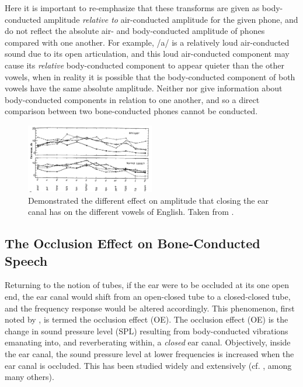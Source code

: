 \documentclass[dissertation,copyright]{uathesis}
\begin{document}
Here it is important to re-emphasize that these transforms are given as body-conducted amplitude \textit{relative to} air-conducted amplitude for the given phone, and do not reflect the absolute air- and body-conducted amplitude of phones compared with one another.  For example, /a/ is a relatively loud air-conducted sound due to its open articulation, and this loud air-conducted component may cause its \textit{relative} body-conducted component to appear quieter than the other vowels, when in reality it is possible that the body-conducted component of both vowels have the same absolute amplitude.  Neither \cite{bekesy:60} nor \cite{reinfeldt:10} give information about body-conducted components in relation to one another, and so a direct comparison between two bone-conducted phones cannot be conducted.


\begin{figure}
\includegraphics[width=0.5\textwidth]{figure/bekesy60-3.png}
\caption{Demonstrated the different effect on amplitude that closing the ear canal has on the different vowels of English.  Taken from \cite{bekesy:60}.}
\label{bekesyPhoneDiff}
\end{figure}

\subsection{The Occlusion Effect on Bone-Conducted Speech}\label{sec:OEBCspeech}

Returning to the notion of tubes, if the ear were to be occluded at its one open end, the ear canal would shift from an open-closed tube to a closed-closed tube, and the frequency response would be altered accordingly.  This phenomenon, first noted by \cite{wheatstone:79}, is termed the occlusion effect (OE).  The occlusion effect (OE) is the change in sound pressure level (SPL) resulting from body-conducted vibrations emanating into, and reverberating within, a \textit{closed} ear canal.  Objectively, inside the ear canal, the sound pressure level at lower frequencies is increased when the ear canal is occluded.  This has been studied widely and extensively (cf. \cite{wheatstone:79,kelly:37,littler:52,tonndorf:66}, among many others).  %
\end{document}
